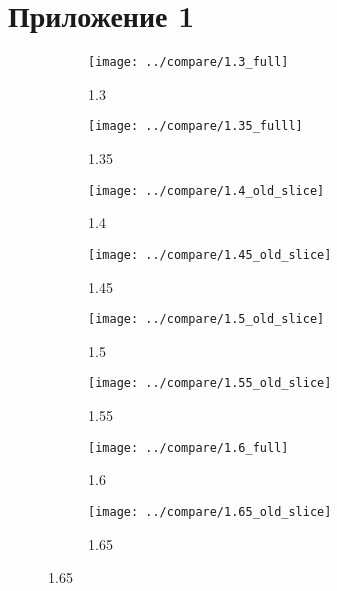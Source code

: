 \documentclass[12pt,a4paper]{article}
\begin{document}
	\section{Приложение 1}
	\begin{figure}[H]
		\begin{subfigure}{.5\textwidth}
		\texttt{[image: ../compare/1.3\_full]}
		\caption{1.3}
		\label{fig:21}
		\end{subfigure}
		\begin{subfigure}{.5\textwidth}
		\texttt{[image: ../compare/1.35\_fulll]}
		\caption{1.35}
		\label{fig:22}
		\end{subfigure}%
	
		\begin{subfigure}{.5\textwidth}
		\texttt{[image: ../compare/1.4\_old\_slice]}
		\caption{1.4}
		\label{fig:23}
		\end{subfigure}
		\begin{subfigure}{.5\textwidth}
		\texttt{[image: ../compare/1.45\_old\_slice]}
		\caption{1.45}
		\label{fig:24}
		\end{subfigure}%
	
		\begin{subfigure}{.5\textwidth}
		\texttt{[image: ../compare/1.5\_old\_slice]}
		\caption{1.5}
		\label{fig:25}
		\end{subfigure}
		\begin{subfigure}{.5\textwidth}
		\texttt{[image: ../compare/1.55\_old\_slice]}
		\caption{1.55}
		\label{fig:26}
		\end{subfigure}%
	
		\begin{subfigure}{.5\textwidth}
		\texttt{[image: ../compare/1.6\_full]}
		\caption{1.6}
		\label{fig:27}
		\end{subfigure}
		\begin{subfigure}{.5\textwidth}
		\texttt{[image: ../compare/1.65\_old\_slice]}
		\caption{1.65}
		\label{fig:28}
		\end{subfigure}%
	\end{figure}
\end{document}

